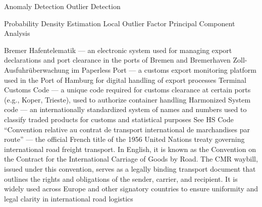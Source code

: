  {Anomaly Detection}
 {Outlier Detection}

 {Probability Density Estimation}
 {Local Outlier Factor}
 {Principal Component Analysis}

 {Bremer Hafentelematik — an electronic system used for managing export declarations and port clearance in the ports of Bremen and Bremerhaven}
 {Zoll-Ausfuhrüberwachung im Paperless Port — a customs export monitoring platform used in the Port of Hamburg for digital handling of export processes}
 {Terminal Customs Code — a unique code required for customs clearance at certain ports (e.g., Koper, Trieste), used to authorize container handling}
 {Harmonized System code — an internationally standardized system of names and numbers used to classify traded products for customs and statistical purposes}
 {See HS Code}
 {``Convention relative au contrat de transport international de marchandises par route'' — the official French title of the 1956 United Nations treaty governing international road freight transport. In English, it is known as the Convention on the Contract for the International Carriage of Goods by Road. The CMR waybill, issued under this convention, serves as a legally binding transport document that outlines the rights and obligations of the sender, carrier, and recipient. It is widely used across Europe and other signatory countries to ensure uniformity and legal clarity in international road logistics}




